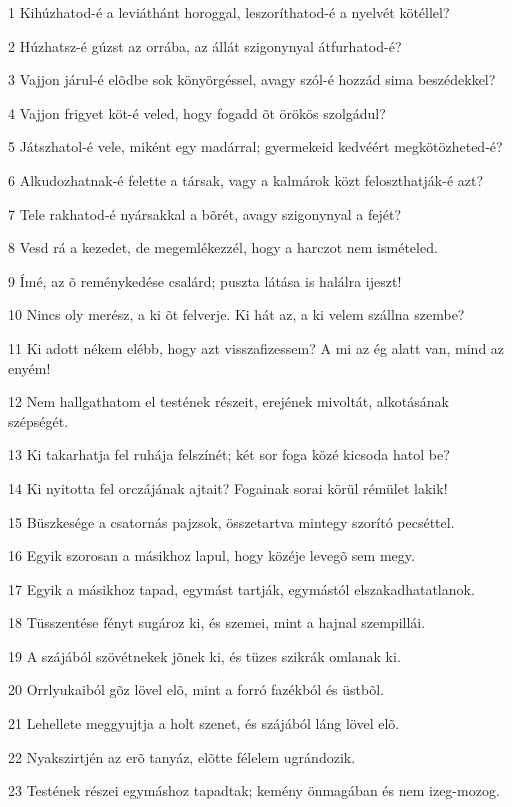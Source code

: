 \par 1 Kihúzhatod-é a leviáthánt horoggal, leszoríthatod-é a nyelvét kötéllel?
\par 2 Húzhatsz-é gúzst az orrába, az állát szigonynyal átfurhatod-é?
\par 3 Vajjon járul-é elõdbe sok könyörgéssel, avagy szól-é hozzád sima beszédekkel?
\par 4 Vajjon frigyet köt-é veled, hogy fogadd õt örökös szolgádul?
\par 5 Játszhatol-é vele, miként egy madárral; gyermekeid kedvéért megkötözheted-é?
\par 6 Alkudozhatnak-é felette a társak, vagy a kalmárok közt feloszthatják-é azt?
\par 7 Tele rakhatod-é nyársakkal a bõrét, avagy szigonynyal a fejét?
\par 8 Vesd rá a kezedet, de megemlékezzél, hogy a harczot nem ismételed.
\par 9 Ímé, az õ reménykedése csalárd; puszta látása is halálra ijeszt!
\par 10 Nincs oly merész, a ki õt felverje. Ki hát az, a ki velem szállna szembe?
\par 11 Ki adott nékem elébb, hogy azt visszafizessem? A mi az ég alatt van, mind az enyém!
\par 12 Nem hallgathatom el testének részeit, erejének mivoltát, alkotásának szépségét.
\par 13 Ki takarhatja fel ruhája felszínét; két sor foga közé kicsoda hatol be?
\par 14 Ki nyitotta fel orczájának ajtait? Fogainak sorai körül rémület lakik!
\par 15 Büszkesége a csatornás pajzsok, összetartva mintegy szorító pecséttel.
\par 16 Egyik szorosan a másikhoz lapul, hogy közéje levegõ sem megy.
\par 17 Egyik a másikhoz tapad, egymást tartják, egymástól elszakadhatatlanok.
\par 18 Tüsszentése fényt sugároz ki, és szemei, mint a hajnal szempillái.
\par 19 A szájából szövétnekek jõnek ki, és tüzes szikrák omlanak ki.
\par 20 Orrlyukaiból gõz lövel elõ, mint a forró fazékból és üstbõl.
\par 21 Lehellete meggyujtja a holt szenet, és szájából láng lövel elõ.
\par 22 Nyakszirtjén az erõ tanyáz, elõtte félelem ugrándozik.
\par 23 Testének részei egymáshoz tapadtak; kemény önmagában és nem izeg-mozog.
